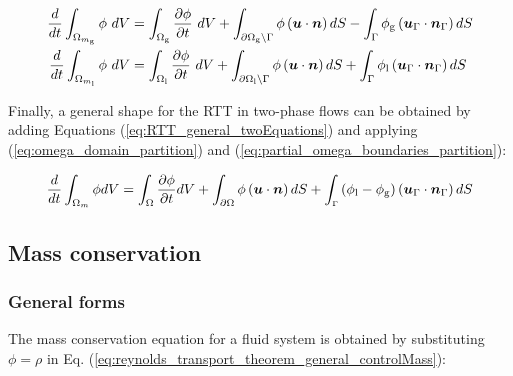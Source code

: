 \begin{subequations}
\label{eq:RTT_general_twoEquations}
\begin{align}
\frac{d}{dt} \int_{\Omega_{m_\mathrm{g}}} \phi ~ dV &=  \int_{\Omega_\mathrm{g}} \frac{\partial \phi}{\partial t} ~ dV + \int_{\partial \Omega_\mathrm{g} \backslash \Gamma} \phi \left( \boldsymbol{u} \cdot \boldsymbol{n} \right) dS - \int_{\Gamma} \phi_\mathrm{g} \left( \boldsymbol{u}_{\scriptsize{\Gamma}} \cdot \boldsymbol{n}_{\scriptsize{\Gamma}} \right) dS \\
\frac{d}{dt} \int_{\Omega_{m_\mathrm{l}}} \phi ~ dV &=  \int_{\Omega_\mathrm{l}} \frac{\partial \phi}{\partial t} ~ dV + \int_{\partial \Omega_\mathrm{l} \backslash \Gamma} \phi \left( \boldsymbol{u} \cdot \boldsymbol{n} \right) dS + \int_{\Gamma} \phi_\mathrm{l} \left( \boldsymbol{u}_{\scriptsize{\Gamma}} \cdot \boldsymbol{n}_{\scriptsize{\Gamma}}\right) dS
\end{align}
\end{subequations}

Finally, a general shape for the RTT in two-phase flows can be obtained by adding Equations (\ref{eq:RTT_general_twoEquations}) and applying (\ref{eq:omega_domain_partition}) and (\ref{eq:partial_omega_boundaries_partition}):

\begin{equation}
\label{eq:RTT_general_bothPhases}
\frac{d}{dt} \int_{\Omega_m} \phi dV =  \int_{\Omega} \frac{\partial \phi}{\partial t}  dV + \int_{\partial \Omega} \phi \left( \boldsymbol{u} \cdot \boldsymbol{n} \right) dS + \int_\mathsmaller{\Gamma} \left( \phi_\mathrm{l} - \phi_\mathrm{g} \right) \left( \boldsymbol{u}_{\scriptsize{\Gamma}} \cdot \boldsymbol{n}_{\scriptsize{\Gamma}} \right) dS
\end{equation}





\subsection{Mass conservation}

\subsubsection*{General forms}

The mass conservation equation for a fluid system is obtained by substituting $\phi = \rho$ in Eq. (\ref{eq:reynolds_transport_theorem_general_controlMass}):


